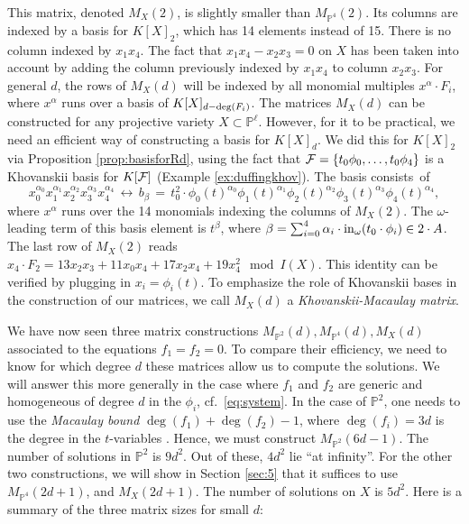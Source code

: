 \documentclass[12pt]{article}
\theoremstyle{definition}
\newenvironment{example}
  {\pushQED{\qed}\renewcommand{\qedsymbol}{$\diamond$}\examplex}
  {\popQED\endexamplex}
\theoremstyle{remark}
\begin{document}
\begin{example}
\noindent This matrix, denoted $M_X(2)$, is slightly smaller than $M_{\mathbb{P}^4}(2)$. Its columns are indexed by a basis for $K[X]_2$, which has 14 elements instead of 15. There is no column indexed by $x_1x_4$. 
The fact that $x_1x_4 - x_2x_3 = 0$ on $X$ has been taken into account by adding the column previously indexed by $x_1x_4$ to column $x_2x_3$. 
For general $d$, the rows of $M_{X}(d)$ will be indexed by all monomial multiples $x^\alpha \cdot F_i$, where $x^\alpha$ runs over a basis of $K[X]_{d-{\rm deg}(F_i)}$.
The matrices $M_X(d)$ can be constructed for any projective variety $X \subset \mathbb{P}^\ell$. However, for it to be practical, we need an efficient way of constructing a basis for $K[X]_d$.
We did this for $K[X]_2$ via Proposition \ref{prop:basisforRd}, using the fact that ${\cal F} = \{t_0 \phi_0, \ldots, t_0  \phi_4 \}$ is a Khovanskii basis for $K[{\cal F}]$ (Example \ref{ex:duffingkhov}). The basis consists~of 
\begin{equation}  \label{eq:xtot} 
x_0^{\alpha_0}x_1^{\alpha_1}x_2^{\alpha_2}x_3^{\alpha_3}x_4^{\alpha_4} \, \longleftrightarrow \, b_\beta \, = \, t_0^2 \cdot \phi_0(t)^{\alpha_0}\phi_1(t)^{\alpha_1}\phi_2(t)^{\alpha_2}\phi_3(t)^{\alpha_3}\phi_4(t)^{\alpha_4}, 
\end{equation}
where $x^\alpha$ runs over the 14 monomials indexing the columns of $M_X(2)$. 
The $\omega$-leading term of this basis element is $t^\beta$, where $\beta = \sum_{i=0}^4 \alpha_i \cdot {\rm in}_\omega(t_0 \cdot \phi_i) \in 2 \cdot A$. The last row of $M_X(2)$ reads $x_4 \cdot F_2 = 13 x_2x_3 + 11 x_0x_4 + 17 x_2 x_4 + 19 x_4^2 \mod I(X)$. This identity can be verified by plugging in $x_i = \phi_i(t)$. To emphasize the role of Khovanskii bases in the construction of our matrices, we call $M_X(d)$ a \emph{Khovanskii-Macaulay matrix}. 

We have now seen three matrix constructions $M_{\mathbb{P}^2}(d), M_{\mathbb{P}^4}(d), M_{X}(d)$ associated to the equations $f_1 = f_2 = 0$. To compare their efficiency, we need to know for which degree $d$ these matrices allow us to compute the solutions. We will answer this more generally in the case where $f_1$ and $f_2$ are generic and homogeneous of degree $d$ in the $\phi_i$, cf.~\eqref{eq:system}. In the case of $\mathbb{P}^2$, one needs to use the \emph{Macaulay bound} $\deg(f_1) + \deg(f_2) - 1$, where $\deg(f_i) = 3d$ is the degree in the $t$-variables \cite[Algorithm 4.2]{telen2020thesis}. Hence, we must construct $M_{\mathbb{P}^2}(6d - 1)$. The number of solutions in $\mathbb{P}^2$ is $9d^2$. Out of these, $4d^2$ lie ``at infinity''. For the other two constructions, we will show in Section \ref{sec:5} that it suffices to use $M_{\mathbb{P}^4}(2d+1)$, and $M_X(2d+1)$. The number of solutions on $X$ is $5d^2$. Here is a summary of the three matrix sizes for small $d$:


\end{example}
\end{document}

